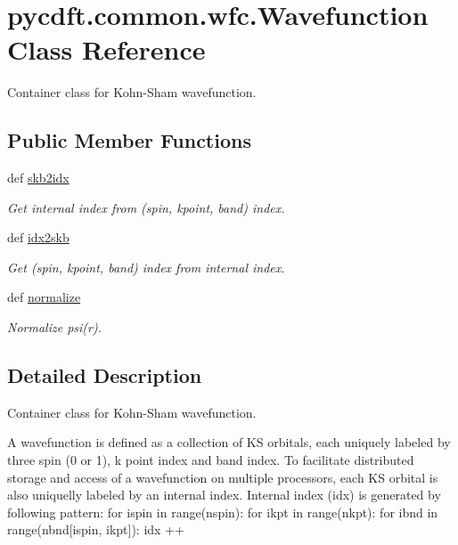 \hypertarget{classpycdft_1_1common_1_1wfc_1_1Wavefunction}{\section{pycdft.\-common.\-wfc.\-Wavefunction Class Reference}
\label{classpycdft_1_1common_1_1wfc_1_1Wavefunction}
}


Container class for Kohn-\/\-Sham wavefunction.  


\subsection*{Public Member Functions}
\begin{DoxyCompactItemize}
\item 
def \hyperlink{classpycdft_1_1common_1_1wfc_1_1Wavefunction_a59cd28cb74be257d2a9873b41abe522c}{skb2idx}
\begin{DoxyCompactList}\small\item\em Get internal index from (spin, kpoint, band) index. \end{DoxyCompactList}\item 
def \hyperlink{classpycdft_1_1common_1_1wfc_1_1Wavefunction_ae7a0efca20a952afa971de4c7dbe8cf5}{idx2skb}
\begin{DoxyCompactList}\small\item\em Get (spin, kpoint, band) index from internal index. \end{DoxyCompactList}\item 
def \hyperlink{classpycdft_1_1common_1_1wfc_1_1Wavefunction_a0c7f4d72c2aa522861cae9d6d3487c8b}{normalize}
\begin{DoxyCompactList}\small\item\em Normalize psi(r). \end{DoxyCompactList}\end{DoxyCompactItemize}


\subsection{Detailed Description}
Container class for Kohn-\/\-Sham wavefunction. 

A wavefunction is defined as a collection of K\-S orbitals, each uniquely labeled by three spin (0 or 1), k point index and band index. To facilitate distributed storage and access of a wavefunction on multiple processors, each K\-S orbital is also uniquelly labeled by an internal index. Internal index (idx) is generated by following pattern\-: for ispin in range(nspin)\-: for ikpt in range(nkpt)\-: for ibnd in range(nbnd\mbox{[}ispin, ikpt\mbox{]})\-: idx ++

